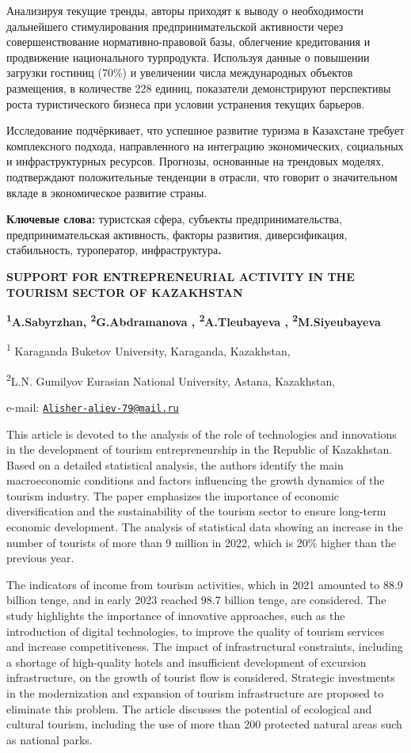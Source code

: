 Анализируя текущие тренды, авторы приходят к выводу о необходимости
дальнейшего стимулирования предпринимательской активности через
совершенствование нормативно-правовой базы, облегчение кредитования и
продвижение национального турпродукта. Используя данные о повышении
загрузки гостиниц (70\%) и увеличении числа международных объектов
размещения, в количестве 228 единиц, показатели демонстрируют
перспективы роста туристического бизнеса при условии устранения текущих
барьеров.

Исследование подчёркивает, что успешное развитие туризма в Казахстане
требует комплексного подхода, направленного на интеграцию экономических,
социальных и инфраструктурных ресурсов. Прогнозы, основанные на
трендовых моделях, подтверждают положительные тенденции в отрасли, что
говорит о значительном вкладе в экономическое развитие страны.

{\bfseries Ключевые слова:} туристская сфера, субъекты предпринимательства,
предпринимательская активность, факторы развития, диверсификация,
стабильность, туроператор, инфраструктура{\bfseries .}

{\bfseries SUPPORT FOR ENTREPRENEURIAL ACTIVITY IN THE TOURISM SECTOR OF
KAZAKHSTAN}

{\bfseries \textsuperscript{1}A.Sabyrzhan\textsuperscript{\envelope },
\textsuperscript{2}G.Abdramanova , \textsuperscript{2}A.Tleubayeva ,
\textsuperscript{2}M.Siyeubayeva}

\textsuperscript{1} Karaganda Buketov University, Karaganda, Kazakhstan,

\textsuperscript{2}L.N. Gumilyov Eurasian National University, Astana,
Kazakhstan,

e-mail:
\href{mailto:Alisher-aliev-79@mail.ru}{\nolinkurl{Alisher-aliev-79@mail.ru}}

This article is devoted to the analysis of the role of technologies and
innovations in the development of tourism entrepreneurship in the
Republic of Kazakhstan. Based on a detailed statistical analysis, the
authors identify the main macroeconomic conditions and factors
influencing the growth dynamics of the tourism industry. The paper
emphasizes the importance of economic diversification and the
sustainability of the tourism sector to ensure long-term economic
development. The analysis of statistical data showing an increase in the
number of tourists of more than 9 million in 2022, which is 20\% higher
than the previous year.

The indicators of income from tourism activities, which in 2021 amounted
to 88.9 billion tenge, and in early 2023 reached 98.7 billion tenge, are
considered. The study highlights the importance of innovative
approaches, such as the introduction of digital technologies, to improve
the quality of tourism services and increase competitiveness. The impact
of infrastructural constraints, including a shortage of high-quality
hotels and insufficient development of excursion infrastructure, on the
growth of tourist flow is considered. Strategic investments in the
modernization and expansion of tourism infrastructure are proposed to
eliminate this problem. The article discusses the potential of
ecological and cultural tourism, including the use of more than 200
protected natural areas such as national parks.

